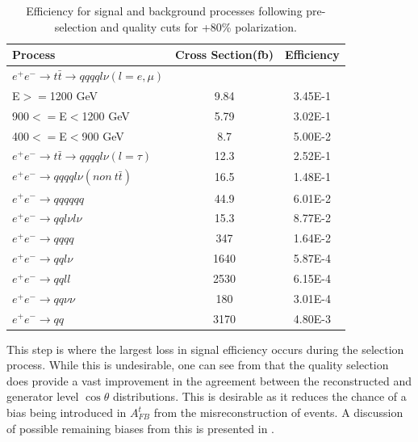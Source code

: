 \begin{table}
  \centering
  \begin{tabular}{l | c | c }
    \toprule
    Process     & Cross Section(fb) & Efficiency \\
    \midrule
    $e^+e^-\rightarrow t\bar{t} \rightarrow qqqql\nu (l=e,\mu)$&  &  \\
    E$>=$1200 GeV & 9.84 & 3.45E-1 \\
    900$<=$E$<$1200 GeV & 5.79 & 3.02E-1 \\
    400$<=$E$<$900 GeV & 8.7 & 5.00E-2 \\
    \midrule
    $e^+e^-\rightarrow t\bar{t} \rightarrow qqqql\nu (l=\tau)$& 12.3 & 2.52E-1\\
    \midrule
    $e^+e^-\rightarrow qqqql\nu (non ~ t\bar{t})$& 16.5 & 1.48E-1\\
    \midrule
    $e^+e^-\rightarrow qqqqqq$ & 44.9 & 6.01E-2 \\
    \midrule
    $e^+e^-\rightarrow qql\nu l\nu$ & 15.3  & 8.77E-2 \\
    \midrule
    $e^+e^-\rightarrow qqqq$ & 347 & 1.64E-2 \\
    \midrule
    $e^+e^-\rightarrow qql\nu$ & 1640 & 5.87E-4 \\
    \midrule
    $e^+e^-\rightarrow qqll$ & 2530 & 6.15E-4 \\
    \midrule
    $e^+e^-\rightarrow qq\nu\nu$ & 180 & 3.01E-4 \\
    \midrule
    $e^+e^-\rightarrow qq$ & 3170 & 4.80E-3 \\
    \bottomrule
  \end{tabular}
  \caption{Efficiency for signal and background processes following pre-selection and quality cuts for +80\% polarization.}
  \label{table:topqualpos}
\end{table}

This step is where the largest loss in signal efficiency occurs during the selection process. While this is undesirable, one can see from  that the quality selection does provide a vast improvement in the agreement between the reconstructed and generator level $\cos\theta$ distributions. This is desirable as it reduces the chance of a bias being introduced in $A_{FB}^t$ from the misreconstruction of events. A discussion of possible remaining biases from this is presented in . 

